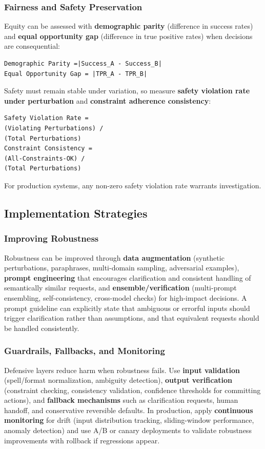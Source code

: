 \begin{TNtwocol}
\subsubsection*{Fairness and Safety Preservation}
Equity can be assessed with \textbf{demographic parity} (difference in success rates) and \textbf{equal opportunity gap} (difference in true positive rates) when decisions are consequential:
\begin{verbatim}
Demographic Parity =|Success_A - Success_B|
Equal Opportunity Gap = |TPR_A - TPR_B|
\end{verbatim}
Safety must remain stable under variation, so measure \textbf{safety violation rate under perturbation} and \textbf{constraint adherence consistency}:
\begin{verbatim}
Safety Violation Rate = 
(Violating Perturbations) / 
(Total Perturbations)
Constraint Consistency = 
(All-Constraints-OK) / 
(Total Perturbations)
\end{verbatim}
For production systems, any non-zero safety violation rate warrants investigation.

\subsection*{Implementation Strategies}

\subsubsection*{Improving Robustness}
Robustness can be improved through \textbf{data augmentation} (synthetic perturbations, paraphrases, multi-domain sampling, adversarial examples), \textbf{prompt engineering} that encourages clarification and consistent handling of semantically similar requests, and \textbf{ensemble/verification} (multi-prompt ensembling, self-consistency, cross-model checks) for high-impact decisions. A prompt guideline can explicitly state that ambiguous or errorful inputs should trigger clarification rather than assumptions, and that equivalent requests should be handled consistently.

\subsubsection*{Guardrails, Fallbacks, and Monitoring}
Defensive layers reduce harm when robustness fails. Use \textbf{input validation} (spell/format normalization, ambiguity detection), \textbf{output verification} (constraint checking, consistency validation, confidence thresholds for committing actions), and \textbf{fallback mechanisms} such as clarification requests, human handoff, and conservative reversible defaults. In production, apply \textbf{continuous monitoring} for drift (input distribution tracking, sliding-window performance, anomaly detection) and use A/B or canary deployments to validate robustness improvements with rollback if regressions appear.


\end{TNtwocol}
